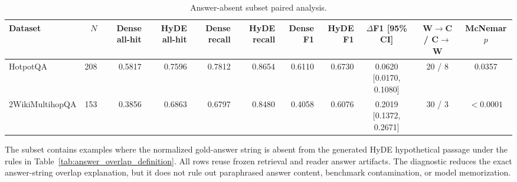 \begin{table}[t]
\centering
\caption{Answer-absent subset paired analysis.}
\label{tab:answer_absent_subset}
\scriptsize
\begin{threeparttable}
\setlength{\tabcolsep}{3pt}
\begin{tabularx}{\textwidth}{>{\raggedright\arraybackslash}X r r r r r r r c c c}
\toprule
Dataset & $N$ & Dense all-hit & HyDE all-hit & Dense recall & HyDE recall & Dense F1 & HyDE F1 & $\Delta$F1 [95\% CI] & W$\rightarrow$C / C$\rightarrow$W & McNemar $p$ \\
\midrule
HotpotQA & 208 & 0.5817 & 0.7596 & 0.7812 & 0.8654 & 0.6110 & 0.6730 & 0.0620 [0.0170, 0.1080] & 20 / 8 & 0.0357 \\
2WikiMultihopQA & 153 & 0.3856 & 0.6863 & 0.6797 & 0.8480 & 0.4058 & 0.6076 & 0.2019 [0.1372, 0.2671] & 30 / 3 & $<0.0001$ \\
\bottomrule
\end{tabularx}
\begin{tablenotes}
\footnotesize
\item The subset contains examples where the normalized gold-answer string is absent from the generated HyDE hypothetical passage under the rules in Table~\ref{tab:answer_overlap_definition}. All rows reuse frozen retrieval and reader answer artifacts. The diagnostic reduces the exact answer-string overlap explanation, but it does not rule out paraphrased answer content, benchmark contamination, or model memorization.
\end{tablenotes}
\end{threeparttable}
\end{table}

